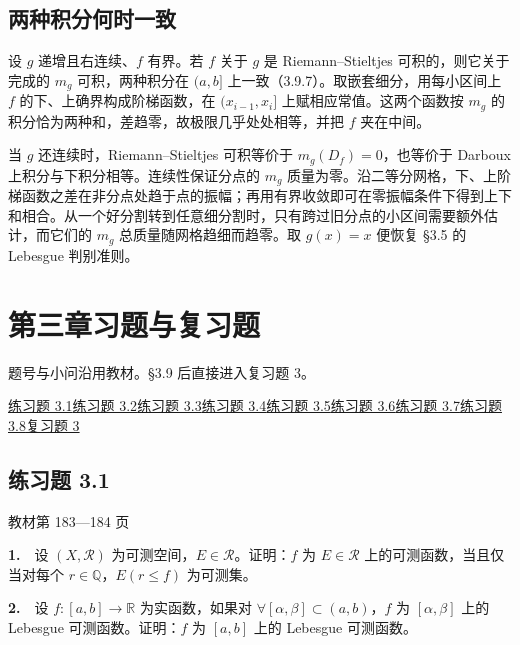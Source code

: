 \documentclass[11pt,a4paper]{article}
\begin{document}
\subsection*{两种积分何时一致}\label{ux4e24ux79cdux79efux5206ux4f55ux65f6ux4e00ux81f4}

设 \(g\) 递增且右连续、\(f\) 有界。若 \(f\) 关于 \(g\) 是 Riemann--Stieltjes 可积的，则它关于完成的 \(m_g\) 可积，两种积分在 \((a,b]\) 上一致（3.9.7）。取嵌套细分，用每小区间上 \(f\) 的下、上确界构成阶梯函数，在 \((x_{i-1},x_i]\) 上赋相应常值。这两个函数按 \(m_g\) 的积分恰为两种和，差趋零，故极限几乎处处相等，并把 \(f\) 夹在中间。

当 \(g\) 还连续时，Riemann--Stieltjes 可积等价于 \(m_g(D_f)=0\)，也等价于 Darboux 上积分与下积分相等。连续性保证分点的 \(m_g\) 质量为零。沿二等分网格，下、上阶梯函数之差在非分点处趋于点的振幅；再用有界收敛即可在零振幅条件下得到上下和相合。从一个好分割转到任意细分割时，只有跨过旧分点的小区间需要额外估计，而它们的 \(m_g\) 总质量随网格趋细而趋零。取 \(g(x)=x\) 便恢复 §3.5 的 Lebesgue 判别准则。

\par{}
\section*{第三章习题与复习题}
题号与小问沿用教材。§3.9 后直接进入复习题 3。
\par\noindent
\hyperlink{ex1}{练习题 3.1}\quad \hyperlink{ex2}{练习题 3.2}\quad \hyperlink{ex3}{练习题 3.3}\quad \hyperlink{ex4}{练习题 3.4}\quad \hyperlink{ex5}{练习题 3.5}\quad \hyperlink{ex6}{练习题 3.6}\quad \hyperlink{ex7}{练习题 3.7}\quad \hyperlink{ex8}{练习题 3.8}\quad \hyperlink{exr}{复习题 3}

\hypertarget{ex1}{}\subsection*{练习题 3.1}
\noindent 教材第 183—184 页

\par{}\noindent \textbf{1.}　设 \((X,\mathcal R)\) 为可测空间，\(E\in\mathcal R\)。证明：\(f\) 为 \(E\in\mathcal R\) 上的可测函数，当且仅当对每个 \(r\in\mathbb Q\)，\(E(r\le f)\) 为可测集。

\par{}\noindent \textbf{2.}　设 \(f:[a,b]\to\mathbb R\) 为实函数，如果对 \(\forall[\alpha,\beta]\subset(a,b)\)，\(f\) 为 \([\alpha,\beta]\) 上的 Lebesgue 可测函数。证明：\(f\) 为 \([a,b]\) 上的 Lebesgue 可测函数。
\end{document}
